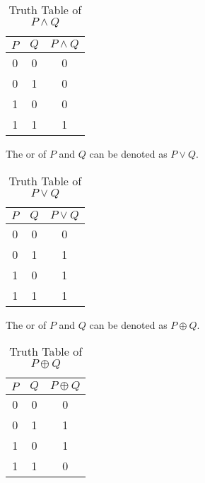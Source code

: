 \begin{table}[htb]
    \centering
    \begin{tabular}[t]{ccc}
        \toprule
        $P$   & $Q$ & $P \land Q$   \\
        \midrule
        0     & 0   & 0             \\
        0     & 1   & 0             \\
        1     & 0   & 0             \\
        1     & 1   & 1             \\
        \bottomrule
    \end{tabular}
    
    \caption{Truth Table of $P \land Q$}
    \label{table:truth_table_and}
\end{table}

\begin{definition} \label{def:or}
    The  or  of $P$ and $Q$ can be denoted as $P \lor Q$.
\end{definition}

\begin{table}[htb]
    \centering
    \begin{tabular}[t]{ccc}
        \toprule
        $P$   & $Q$ & $P \lor Q$   \\
        \midrule
        0     & 0   & 0             \\
        0     & 1   & 1             \\
        1     & 0   & 1             \\
        1     & 1   & 1             \\
        \bottomrule
    \end{tabular}
    
    \caption{Truth Table of $P \lor Q$}
    \label{table:truth_table_or}
\end{table}

\begin{definition} \label{def:xor}
    The  or  of $P$ and $Q$ can be denoted as $P \oplus Q$.
\end{definition}

\begin{table}[htb]
    \centering
    \begin{tabular}[t]{ccc}
        \toprule
        $P$   & $Q$ & $P \oplus Q$   \\
        \midrule
        0     & 0   & 0             \\
        0     & 1   & 1             \\
        1     & 0   & 1             \\
        1     & 1   & 0             \\
        \bottomrule
    \end{tabular}
    
    \caption{Truth Table of $P \oplus Q$}
    \label{table:truth_table_xor}
\end{table}


